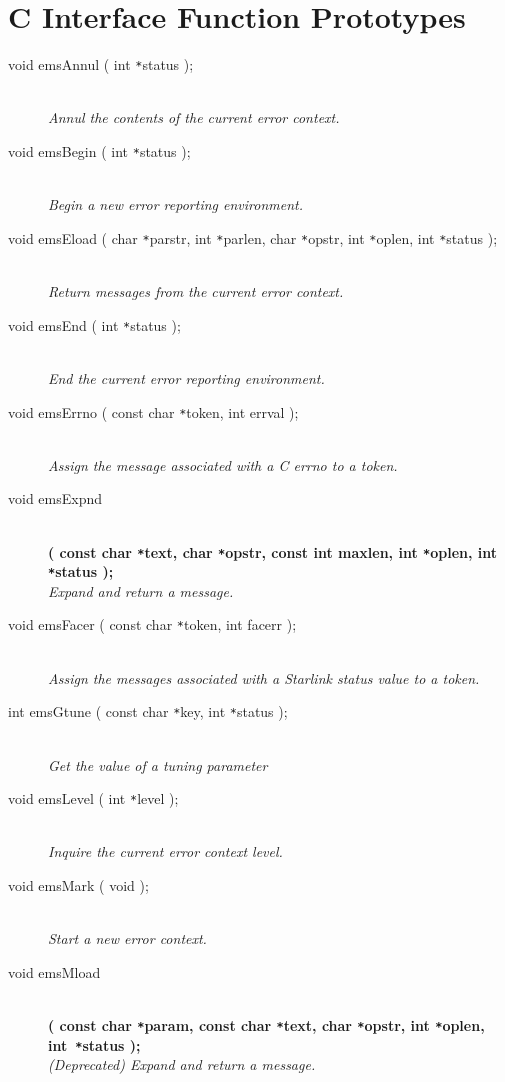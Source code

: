 \documentclass[twoside,11pt]{article}
\newcommand{\xlabel}[1]{}
\renewcommand{\_}{\texttt{\symbol{95}}}
\newcommand{\listline}{\hspace{1pt}\\}
\newcommand{\listline}{}
\begin{document}
\section{\xlabel{c_interface_function_prototypes}C Interface Function
Prototypes} \label{C_sect}
\begin {description} 

\item[void emsAnnul ( int \texttt{*}status );] \listline
\textit{Annul the contents of the current error context.}

\item[void emsBegin ( int \texttt{*}status );] \listline
\textit{Begin a new error reporting environment.}

\item[void emsEload
( char \texttt{*}parstr, int \texttt{*}parlen, char \texttt{*}opstr, 
int \texttt{*}oplen, int \texttt{*}status );] \listline
\textit{Return messages from the current error context.}

\item[void emsEnd ( int \texttt{*}status );] \listline
\textit{End the current error reporting environment.}

\item[void emsErrno ( const char \texttt{*}token, int errval );] \listline
\textit{Assign the message associated with a C errno to a token.}

\item[void emsExpnd] \listline
\textbf{( const char \texttt{*}text, char \texttt{*}opstr,
const int maxlen, int \texttt{*}oplen, int \texttt{*}status );} \\
\textit{Expand and return a message.}

\item[void emsFacer ( const char \texttt{*}token, int facerr );] \listline
\textit{Assign the messages associated with a Starlink status value to a
token.}

\item[int emsGtune ( const char \texttt{*}key, int \texttt{*}status );] 
\listline
\textit{Get the value of a tuning parameter}

\item[void emsLevel ( int \texttt{*}level );] \listline
\textit{Inquire the current error context level.}

\item[void emsMark ( void );] \listline
\textit{Start a new error context.}

\item[void emsMload] \listline 
\textbf{( const char \texttt{*}param, const char \texttt{*}text, 
char \texttt{*}opstr, int \texttt{*}oplen, int~\texttt{*}status );} \\
\textit{(Deprecated) Expand and return a message.}


\end{description}
\end{document}
